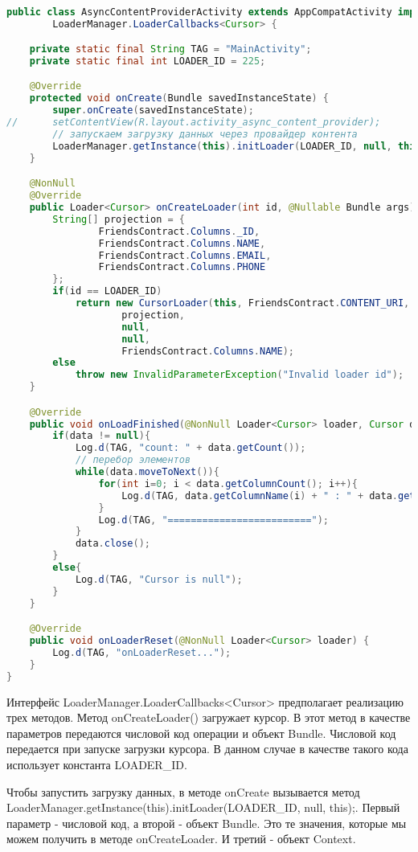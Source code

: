 \begin{lstlisting}[language=Java
	, label=lst:
	]

public class AsyncContentProviderActivity extends AppCompatActivity implements
		LoaderManager.LoaderCallbacks<Cursor> {

	private static final String TAG = "MainActivity";
	private static final int LOADER_ID = 225;

	@Override
	protected void onCreate(Bundle savedInstanceState) {
		super.onCreate(savedInstanceState);
//		setContentView(R.layout.activity_async_content_provider);
		// запускаем загрузку данных через провайдер контента
		LoaderManager.getInstance(this).initLoader(LOADER_ID, null, this);
	}

	@NonNull
	@Override
	public Loader<Cursor> onCreateLoader(int id, @Nullable Bundle args) {
		String[] projection = {
				FriendsContract.Columns._ID,
				FriendsContract.Columns.NAME,
				FriendsContract.Columns.EMAIL,
				FriendsContract.Columns.PHONE
		};
		if(id == LOADER_ID)
			return new CursorLoader(this, FriendsContract.CONTENT_URI,
					projection,
					null,
					null,
					FriendsContract.Columns.NAME);
		else
			throw new InvalidParameterException("Invalid loader id");
	}

	@Override
	public void onLoadFinished(@NonNull Loader<Cursor> loader, Cursor data) {
		if(data != null){
			Log.d(TAG, "count: " + data.getCount());
			// перебор элементов
			while(data.moveToNext()){
				for(int i=0; i < data.getColumnCount(); i++){
					Log.d(TAG, data.getColumnName(i) + " : " + data.getString(i));
				}
				Log.d(TAG, "=========================");
			}
			data.close();
		}
		else{
			Log.d(TAG, "Cursor is null");
		}
	}

	@Override
	public void onLoaderReset(@NonNull Loader<Cursor> loader) {
		Log.d(TAG, "onLoaderReset...");
	}
}
\end{lstlisting}

Интерфейс LoaderManager.LoaderCallbacks<Cursor> предполагает
реализацию трех методов. Метод onCreateLoader() загружает курсор. В этот
метод в качестве параметров передаются числовой код операции и объект
Bundle. Числовой код передается при запуске загрузки курсора. В данном
случае в качестве такого кода использует константа LOADER\_ID.\par
Чтобы запустить загрузку данных, в методе onCreate вызывается метод
LoaderManager.getInstance(this).initLoader(LOADER\_ID, null, this);.
Первый параметр - числовой код, а второй - объект Bundle. Это те значения,
которые мы можем получить в методе onCreateLoader. И третий - объект
Context.

